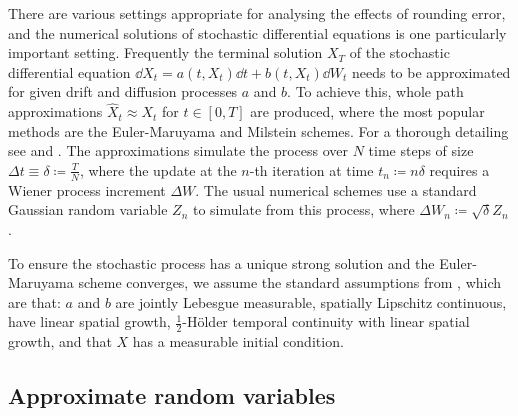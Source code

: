 \documentclass[9pt,a4paper,english]{extarticle}
\begin{document}
There are various settings appropriate for analysing the effects of rounding error, and the numerical solutions of stochastic differential equations is one particularly important setting. Frequently the terminal solution $ X_T $ of the stochastic differential equation $ \dd{X_t} = a(t, X_t) \dd{t} + b(t, X_t)\dd{W_t} $ needs to be approximated for given drift and diffusion processes $ a $ and $ b $. To achieve this, whole path approximations $ \widehat{X}_t \approx X_t $ for $ t \in [0, T] $ are produced, where the most popular methods are the Euler-Maruyama and Milstein schemes. For a thorough  detailing see \citet{kloeden1999numerical} and \citet{glasserman2013monte}. The approximations simulate the process over $ N $ time steps of size $ \Delta t \equiv \delta \coloneqq \tfrac{T}{N} $, where the update at the $ n $-th iteration at time $ t_n \coloneqq n\delta $ requires a Wiener process increment $ \Delta W $. The usual numerical schemes use a standard Gaussian random variable $ Z_n $ to simulate from this process, where $ \Delta W_n \coloneqq \sqrt{\delta} Z_n $. 

To ensure the stochastic process has a unique strong solution and the Euler-Maruyama scheme converges, we assume the standard assumptions from \citet[4.5]{kloeden1999numerical}, which are that: $ a $ and $ b $ are jointly Lebesgue measurable, spatially Lipschitz continuous, have linear spatial growth, $ \tfrac{1}{2} $-H\"{o}lder temporal continuity with linear spatial growth, and that $ X $ has a measurable initial condition.

\subsection{Approximate random variables}
\label{sec:approximate_random_variables}
\end{document}
